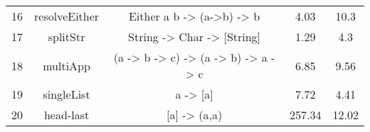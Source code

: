 \documentclass[acmsmall,nonacm]{acmart}
\begin{document}
\begin{table*}
\begin{tabular}{c c c | c | c }
    16 & resolveEither	&	Either a b -> (a->b) -> b	&	4.03&		10.3\\ %
    17 & splitStr	&	String -> Char -> [String]	&	1.29&		4.3\\ %
    18 & multiApp	&	(a -> b -> c) -> (a -> b) -> a -> c	&	6.85	&	9.56	\\ %
    19 & singleList	&	a -> [a]	&	7.72&		4.41\\ %
    20 & head-last	&	[a] -> (a,a)	&	257.34&		12.02	\\ %

\end{tabular}
\end{table*}
\end{document}
